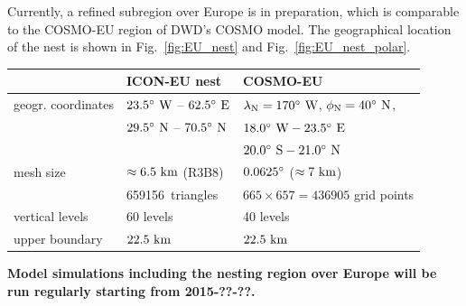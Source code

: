 Currently, a refined subregion over Europe is in preparation,
which is comparable to the COSMO-EU region of DWD's COSMO model.
The geographical location of the nest is shown in
Fig.~\ref{fig:EU_nest} and Fig.~\ref{fig:EU_nest_polar}.

\begin{table}
\centering
\begin{tabular}{|p{5cm}|l|l|}\hline
\rowcolor{Gray}
                           &    {\centering\textbf{ICON-EU nest}}                 &     {\centering\textbf{COSMO-EU}} \\ \hline\hline
geogr. coordinates         &    $23.5^{\circ}~\text{W}$ -- $62.5^{\circ}~\text{E}$    &     $\lambda_{\text{N}} = 170^{\circ}~\text{W}$, 
                                                                                          $\phi_{\text{N}}    =  40^{\circ}~\text{N}$,     \\
                           &    $29.5^{\circ}~\text{N}$ -- $70.5^{\circ}~\text{N}$   &      $18.0^{\circ}~\text{W} - 23.5^{\circ}~\text{E}$ \\
                           &                                                      &     $20.0^{\circ}~\text{S} - 21.0^{\circ}~\text{N}$  \\[0.5em]
mesh size                  &    $\approx 6.5~\text{km}$ (R3B8)                          &     $0.0625^{\circ}$ ($\approx 7~\text{km}$) \\
                           &    659156~triangles                                  &     $665 \times 657 = 436905$ grid points \\
vertical levels            &    60 levels                                         &     40 levels      \\
upper boundary             &    $22.5~\text{km}$                                        &     $22.5~\text{km}$ \\ \hline

\end{tabular}
\end{table}

\begin{note}
  \begin{center}
    \textbf{Model simulations including the nesting region over
      Europe will be run regularly starting from 2015-??-??.}
  \end{center}
\end{note}


